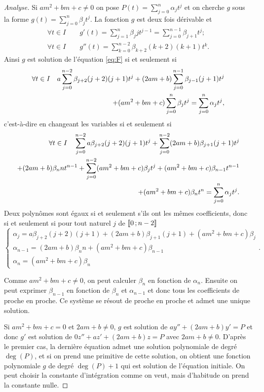 \begin{proof}[Analyse]
Si \(am^2+bm+c \neq 0\) on pose \(P(t)=\sum_{j=0}^{n} \alpha_j t^j\) et on cherche \(g\) sous la forme \(g(t)=\sum_{j=0}^{n} \beta_j t^j\). La fonction \(g\) est deux fois dérivable et 
\begin{gather}
\forall t \in I \qquad g'(t)=\sum_{j=1}^n \beta_j j t^{j-1}=\sum_{j=0}^{n-1} \beta_{j+1} t^j; \\
\forall t \in I \qquad g''(t)=\sum_{k=0}^{n-2} \beta_{k+2} (k+2)(k+1) t^k.
\end{gather}
 Ainsi \(g\) est solution de l'équation \eqref{eq:F} si et seulement si 
  \begin{align}
    \forall t \in I \quad  a \sum_{j=0}^{n-2} \beta_{j+2} (j+2)(j+1)t^j+ (2am+b) \sum_{j=0}^{n-1} \beta_{j-1}(j+1)t^j \notag \\
      + (am^2+bm+c)\sum_{j=0}^{n} \beta_j t^j  =  \sum_{j=0}^{n} \alpha_j t^j,
\end{align}
c'est-à-dire en changeant les variables si et seulement si
\begin{align}
    \forall t \in I \quad \sum_{j=0}^{n-2} a\beta_{j+2} (j+2)(j+1)t^j +  \sum_{j=0}^{n-2}(2am+b)\beta_{j+1}(j+1)t^j  \notag \\ 
    + (2am+b)\beta_n nt^{n-1}+ \sum_{j=0}^{n-2} (am^2+bm+c) \beta_j t^j  + (am^2+bm+c)\beta_{n-1} t^{n-1} \notag \\ 
    + (am^2+bm+c) \beta_nt^n=\sum_{j=0}^{n} \alpha_j t^j.
  \end{align}
Deux polynômes sont égaux si et seulement s'ils ont les mêmes coefficients, donc si et seulement si pour tout naturel \(j\) de \(\mathopen{\llbracket}0\mathclose{}\mathpunct{};n-2\mathclose{\rrbracket}\)
\begin{equation}
  \begin{cases}
    \alpha_j= a \beta_{j+2}(j+2)(j+1)+(2am+b)\beta_{j+1}(j+1)+(am^2+bm+c)\beta_j\\ 
    \alpha_{n-1}= (2am+b)\beta_n n +(am^2+bm+c)\beta_{n-1} \\ 
    \alpha_n=(am^2+bm+c) \beta_n
  \end{cases}.
\end{equation}

Comme \(am^2+bm+c \neq 0\), on peut calculer \(\beta_n\) en fonction de \(\alpha_n\). Ensuite on peut exprimer \(\beta_{n-1}\) en fonction de \(\beta_{n}\) et \(\alpha_{n-1}\) et donc tous les coefficients de proche en proche. Ce système se résout de proche en proche et admet une unique solution.

Si \(am^2+bm+c=0\) et \(2am+b \neq 0\), \(g\) est solution de \(ay''+(2am+b)y'=P\) et donc \(g'\) est solution de \(0z''+az'+(2am+b)z=P\) avec \(2am+b \neq 0\). D'après le premier cas, la dernière équation admet une solution polynomiale de degré \(\deg(P)\), et si on prend une primitive de cette solution, on obtient une fonction polynomiale \(g\) de degré \(\deg(P) + 1\) qui est solution de l'équation initiale. On peut choisir la constante d'intégration comme on veut, mais d'habitude on prend la constante nulle.


\end{proof}
